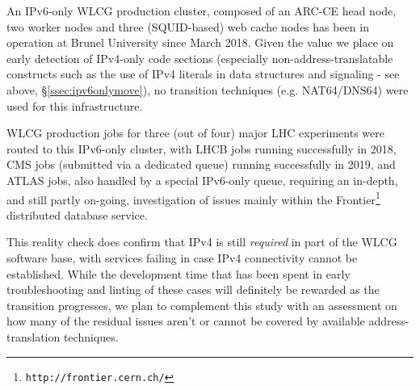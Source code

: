 %
An IPv6-only WLCG production cluster, composed of an ARC-CE head node,
two worker nodes and three (SQUID-based) web cache nodes has been
in operation at Brunel University since March 2018. Given the value
we place on early detection of IPv4-only code sections (especially
non-address-translatable constructs such as the use of IPv4 literals in
data structures and signaling - see above, \S\ref{ssec:ipv6onlymove}),
no transition techniques (e.g. NAT64/DNS64) were used for this
infrastructure.
\par
WLCG production jobs for three (out of four) major LHC experiments were routed
to this IPv6-only cluster, with LHCB jobs running successfully in
2018, CMS jobs (submitted via a dedicated queue) running successfully in 2019,
and ATLAS jobs, also handled by a special IPv6-only queue, requiring an
in-depth, and still partly on-going, investigation of issues mainly within the
Frontier\footnote{\tt http://frontier.cern.ch/} distributed database
service.
\par
This reality check does confirm that IPv4 is still {\it required} in part
of the WLCG software base, with services failing in case IPv4 connectivity
cannot be established. While the development time that has been spent in 
early troubleshooting and linting of these cases will definitely be rewarded
as the transition progresses, we plan to complement this study with 
an assessment on how many of the residual issues aren't or cannot be covered
by available address-translation techniques.

